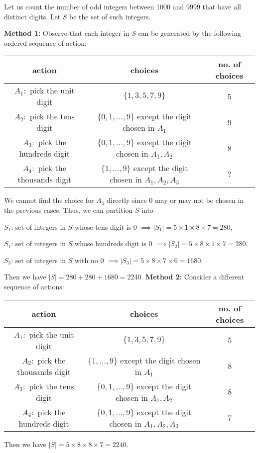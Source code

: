 \begin{eg}
    Let us count the number of odd integers between 1000 and 9999 that have all distinct digits. Let \(S\) be the set of such integers. 
    
    \textbf{Method 1:} Observe that each integer in \(S\) can be generated by the following ordered sequence of action:
    \begin{table}[H]
        \centering
        \begin{tabular}{c|c|c}
                action & choices & no. of choices  \\
            \midrule
                \(A_1:\) pick the unit digit & \(\{1, 3, 5, 7, 9\}\)  & 5  \\
                \(A_2:\) pick the tens digit & \(\{0, 1, \dots, 9\}\) except the digit chosen in \(A_1\) & 9  \\
                \(A_3:\) pick the hundreds digit & \(\{0, 1, \dots, 9\}\) except the digit chosen in \(A_1, A_2\) & 8  \\
                \(A_4:\) pick the thousands digit & \(\{1, \dots, 9\}\) except the digit chosen in \(A_1, A_2, A_3\) & ?  \\
        \end{tabular}
    \end{table}
    We cannot find the choice for \(A_4\) directly since 0 may or may not be chosen in the previous cases. Thus, we can partition \(S\) into

    \(S_1\): set of integers in \(S\) whose tens digit is 0 \(\implies \vert S_1 \vert = 5 \times 1 \times 8 \times 7 = 280\),

    \(S_1\): set of integers in \(S\) whose hundreds digit is 0 \(\implies \vert S_2 \vert = 5 \times 8 \times 1 \times 7 = 280\),

    \(S_3\): set of integers in \(S\) with no 0 \(\implies \vert S_3 \vert = 5 \times 8 \times 7 \times 6 = 1680\).

    Then we have \(\vert S \vert = 280 + 280 + 1680 = 2240\). 
    \newpage
    \textbf{Method 2:} Consider a different sequence of actions:
    \begin{table}[H]
        \centering
        \begin{tabular}{c|c|c}
                action & choices & no. of choices  \\
            \midrule
                \(A_1:\) pick the unit digit & \(\{1, 3, 5, 7, 9\}\)  & 5  \\
                \(A_2:\) pick the thousands digit & \(\{1, \dots, 9\}\) except the digit chosen in \(A_1\) & 8  \\
                \(A_3:\) pick the tens digit & \(\{0, 1, \dots, 9\}\) except the digit chosen in \(A_1, A_2\) & 8  \\
                \(A_4:\) pick the hundreds digit & \(\{0, 1, \dots, 9\}\) except the digit chosen in \(A_1, A_2, A_3\) & 7  \\
        \end{tabular}
    \end{table}
    Then we have \(\vert S \vert = 5 \times 8 \times 8 \times 7 = 2240\). 
\end{eg}

